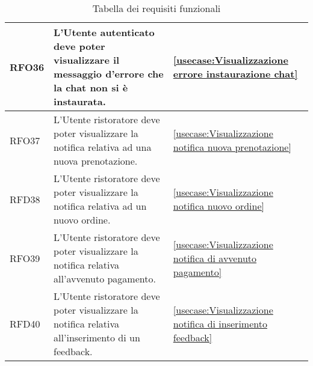 \begin{table}[H]
\begin{tabularx}{\textwidth}{l|X|p{2cm}}
		\hline
		RFO36       & L'Utente autenticato deve poter visualizzare il messaggio d'errore che la chat non si è instaurata.               & \autoref{usecase:Visualizzazione errore instaurazione chat}                           \\
		\hline
		RFO37       & L'Utente ristoratore deve poter visualizzare la notifica relativa ad una nuova prenotazione.                      & \autoref{usecase:Visualizzazione notifica nuova prenotazione}                               \\
		\hline
		RFD38       & L'Utente ristoratore deve poter visualizzare la notifica relativa ad un nuovo ordine.                             & \autoref{usecase:Visualizzazione notifica nuovo ordine}                               \\
		\hline
		RFO39       & L'Utente ristoratore deve poter visualizzare la notifica relativa all'avvenuto pagamento.                         & \autoref{usecase:Visualizzazione notifica di avvenuto pagamento}                      \\
		\hline
		RFD40       & L'Utente ristoratore deve poter visualizzare la notifica relativa all'inserimento di un feedback.                 & \autoref{usecase:Visualizzazione notifica di inserimento feedback}                    \\
	\end{tabularx}
	\caption{Tabella dei requisiti funzionali}
\end{table}


